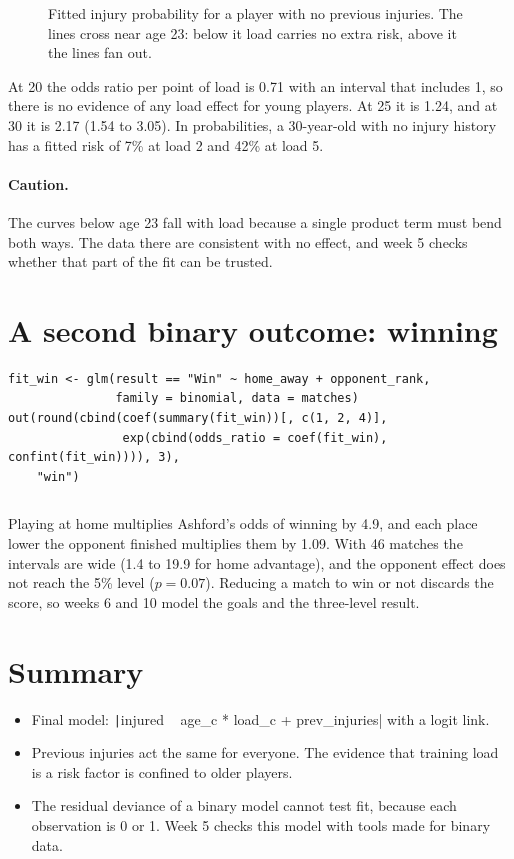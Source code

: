 \documentclass[12pt,notitlepage]{report}
\begin{document}
\inputminted{text}{output/load-effect.txt}

\begin{figure}[H]
  \centering
  \caption{Fitted injury probability for a player with no previous injuries.
    The lines cross near age 23: below it load carries no extra risk, above
    it the lines fan out.}
  \label{fig:fitted}
\end{figure}

At 20 the odds ratio per point of load is 0.71 with an interval that includes
1, so there is no evidence of any load effect for young players. At 25 it is
1.24, and at 30 it is 2.17 (1.54 to 3.05). In probabilities, a 30-year-old
with no injury history has a fitted risk of 7\% at load 2 and 42\% at load 5.

\paragraph{Caution.}
The curves below age 23 fall with load because a single product term must
bend both ways. The data there are consistent with no effect, and week 5
checks whether that part of the fit can be trusted.

\section{A second binary outcome: winning}

\begin{verbatim}
fit_win <- glm(result == "Win" ~ home_away + opponent_rank,
               family = binomial, data = matches)
out(round(cbind(coef(summary(fit_win))[, c(1, 2, 4)],
                exp(cbind(odds_ratio = coef(fit_win), confint(fit_win)))), 3),
    "win")
\end{verbatim}

\inputminted[fontsize=\footnotesize]{text}{output/win.txt}

Playing at home multiplies Ashford's odds of winning by 4.9, and each place
lower the opponent finished multiplies them by 1.09. With 46 matches the
intervals are wide (1.4 to 19.9 for home advantage), and the opponent effect
does not reach the 5\% level ($p = 0.07$). Reducing a match to win or not
discards the score, so weeks 6 and 10 model the goals and the three-level
result.

\section{Summary}

\begin{itemize}
  \item Final model: \texttt|injured ~ age_c * load_c + prev_injuries|
    with a logit link.
  \item Previous injuries act the same for everyone. The evidence that training
    load is a risk factor is confined to older players.
  \item The residual deviance of a binary model cannot test fit, because each
    observation is 0 or 1. Week 5 checks this model with tools made for
    binary data.
\end{itemize}
\end{document}
